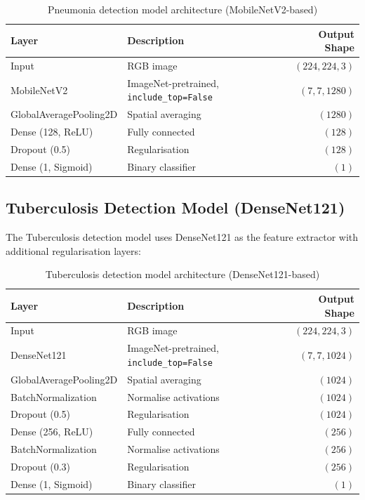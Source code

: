 \documentclass[12pt, a4paper, oneside]{report}
\begin{document}
\begin{table}[H]
\centering
\caption{Pneumonia detection model architecture (MobileNetV2-based)}
\label{tab:pneumonia_arch}
\begin{tabular}{llr}
\toprule
\textbf{Layer} & \textbf{Description} & \textbf{Output Shape} \\
\midrule
Input & RGB image & $(224, 224, 3)$ \\
MobileNetV2 & ImageNet-pretrained, \texttt{include\_top=False} & $(7, 7, 1280)$ \\
GlobalAveragePooling2D & Spatial averaging & $(1280)$ \\
Dense (128, ReLU) & Fully connected & $(128)$ \\
Dropout (0.5) & Regularisation & $(128)$ \\
Dense (1, Sigmoid) & Binary classifier & $(1)$ \\
\bottomrule
\end{tabular}
\end{table}

\subsection{Tuberculosis Detection Model (DenseNet121)}
\label{subsec:tb_arch}

The Tuberculosis detection model uses DenseNet121 as the feature extractor with additional regularisation layers:

\begin{table}[H]
\centering
\caption{Tuberculosis detection model architecture (DenseNet121-based)}
\label{tab:tb_arch}
\begin{tabular}{llr}
\toprule
\textbf{Layer} & \textbf{Description} & \textbf{Output Shape} \\
\midrule
Input & RGB image & $(224, 224, 3)$ \\
DenseNet121 & ImageNet-pretrained, \texttt{include\_top=False} & $(7, 7, 1024)$ \\
GlobalAveragePooling2D & Spatial averaging & $(1024)$ \\
BatchNormalization & Normalise activations & $(1024)$ \\
Dropout (0.5) & Regularisation & $(1024)$ \\
Dense (256, ReLU) & Fully connected & $(256)$ \\
BatchNormalization & Normalise activations & $(256)$ \\
Dropout (0.3) & Regularisation & $(256)$ \\
Dense (1, Sigmoid) & Binary classifier & $(1)$ \\
\bottomrule
\end{tabular}
\end{table}
\end{document}
